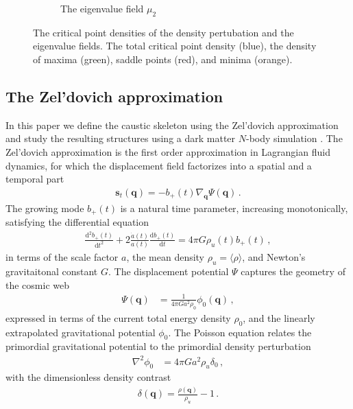 \documentclass[a4paper, 11pt]{article}
\begin{document}
\begin{figure}
\begin{subfigure}[b]{0.32\textwidth}
\caption{The eigenvalue field $\mu_2$}
\end{subfigure}
\caption{The critical point densities of the density pertubation and the eigenvalue fields. The total critical point density (blue), the density of maxima (green), saddle points (red), and minima (orange).}\label{fig:critical}
\end{figure}
\subsection{The Zel'dovich approximation}\label{sec:Zeldovich}
In this paper we define the caustic skeleton using the Zel'dovich approximation \cite{Zeldovich:1970} and study the resulting structures using a dark matter $N$-body simulation \cite{Hidding:2020}. The Zel'dovich approximation is the first order approximation in Lagrangian fluid dynamics, for which the displacement field factorizes into a spatial and a temporal part
\begin{align}
\bm{s}_t(\bm{q}) = - b_+(t) \nabla_{\bm{q}} \Psi(\bm{q})\,.
\end{align}
The growing mode $b_+(t)$ is a natural time parameter, increasing monotonically, satisfying the differential equation
\begin{align}
\frac{\mathrm{d}^2 b_+(t)}{\mathrm{d}t^2} + 2 \frac{\dot{a}(t)}{a(t)} \frac{\mathrm{d} b_+(t)}{\mathrm{d}t} = 4 \pi G \rho_u(t) b_+(t)\,,
\end{align}
in terms of the scale factor $a$, the mean density $\rho_u = \langle \rho \rangle$, and Newton's gravitaitonal constant $G$. The displacement potential $\Psi$ captures the geometry of the cosmic web
\begin{align}
\Psi(\bm{q}) &=\frac{1}{4 \pi G a^2 \rho_0}\phi_0(\bm{q})%
\,,
\end{align}
expressed in terms of the current total energy density %
$\rho_0$,
and the linearly extrapolated gravitational potential $\phi_0$. The Poisson equation relates the primordial gravitational potential to the primordial density perturbation
\begin{align}
\nabla ^2 \phi_0 &= 4 \pi G a^2 \rho_u \delta_0\,,%
\end{align}
with the dimensionless density contrast
\begin{align}
\delta(\bm{q}) = \frac{\rho(\bm{q})}{\rho_u} -1\,.
\end{align}
\end{document}
